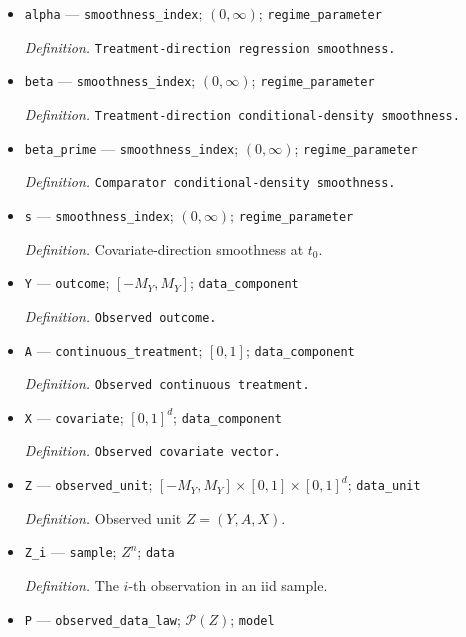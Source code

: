 \documentclass{article}
\begin{document}
\begin{itemize}
  \item \texttt{alpha} --- \texttt{smoothness\_\allowbreak{}index}; \((0,\infty)\); \texttt{regime\_\allowbreak{}parameter}
  \par\smallskip\noindent\emph{Definition.} \texttt{Treatment-\allowbreak{}direction regression smoothness.}
  \item \texttt{beta} --- \texttt{smoothness\_\allowbreak{}index}; \((0,\infty)\); \texttt{regime\_\allowbreak{}parameter}
  \par\smallskip\noindent\emph{Definition.} \texttt{Treatment-\allowbreak{}direction conditional-\allowbreak{}density smoothness.}
  \item \texttt{beta\_\allowbreak{}prime} --- \texttt{smoothness\_\allowbreak{}index}; \((0,\infty)\); \texttt{regime\_\allowbreak{}parameter}
  \par\smallskip\noindent\emph{Definition.} \texttt{Comparator conditional-\allowbreak{}density smoothness.}
  \item \texttt{s} --- \texttt{smoothness\_\allowbreak{}index}; \((0,\infty)\); \texttt{regime\_\allowbreak{}parameter}
  \par\smallskip\noindent\emph{Definition.} Covariate-direction smoothness at \(t_0\).
  \item \texttt{Y} --- \texttt{outcome}; \([-M_Y,M_Y]\); \texttt{data\_\allowbreak{}component}
  \par\smallskip\noindent\emph{Definition.} \texttt{Observed outcome.}
  \item \texttt{A} --- \texttt{continuous\_\allowbreak{}treatment}; \([0,1]\); \texttt{data\_\allowbreak{}component}
  \par\smallskip\noindent\emph{Definition.} \texttt{Observed continuous treatment.}
  \item \texttt{X} --- \texttt{covariate}; \([0,1]^d\); \texttt{data\_\allowbreak{}component}
  \par\smallskip\noindent\emph{Definition.} \texttt{Observed covariate vector.}
  \item \texttt{Z} --- \texttt{observed\_\allowbreak{}unit}; \([-M_Y,M_Y]\times[0,1]\times[0,1]^d\); \texttt{data\_\allowbreak{}unit}
  \par\smallskip\noindent\emph{Definition.} Observed unit \(Z=(Y,A,X)\).
  \item \texttt{Z\_\allowbreak{}i} --- \texttt{sample}; \(Z^n\); \texttt{data}
  \par\smallskip\noindent\emph{Definition.} The \(i\)-th observation in an iid sample.
  \item \texttt{P} --- \texttt{observed\_\allowbreak{}data\_\allowbreak{}law}; \(\mathcal P(Z)\); \texttt{model}

\end{itemize}
\end{document}

